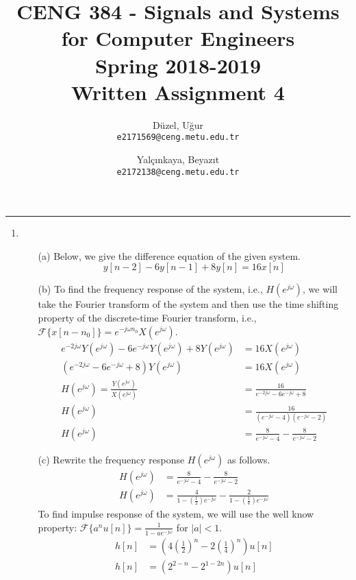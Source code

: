 \documentclass[10pt,a4paper, margin=1in]{article}
\author{
  Düzel, Uğur\\
  \texttt{e2171569@ceng.metu.edu.tr}
  \and
  Yalçınkaya, Beyazıt\\
  \texttt{e2172138@ceng.metu.edu.tr}
}
\title{CENG 384 - Signals and Systems for Computer Engineers \\
Spring 2018-2019 \\
Written Assignment 4}
\begin{document}
\maketitle



\noindent\rule{19cm}{1.2pt}

\begin{enumerate}

\item 
	\begin{itemize}
		\item[(a)]
			Below, we give the difference equation of the given system.
			\begin{equation}
				y[n - 2] - 6y[n - 1] + 8y[n] = 16x[n]
			\end{equation}
		
		\item[(b)]
			To find the frequency response of the system, i.e., $H(e^{j\omega})$, we will take the Fourier transform of the system and then use the time shifting property of the discrete-time Fourier transform, i.e., $\mathcal{F}\{x[n - n_0]\} = e^{-j\omega n_0} X(e^{j\omega})$.
			\begin{equation}
			\begin{split}
				e^{-2j\omega } Y(e^{j\omega}) - 6e^{-j\omega } Y(e^{j\omega}) + 8Y(e^{j\omega}) & = 16X(e^{j\omega})\\
				(e^{-2j\omega } - 6e^{-j\omega } + 8)Y(e^{j\omega}) & = 16X(e^{j\omega})\\
				H(e^{j\omega}) = \frac{Y(e^{j\omega})}{X(e^{j\omega})} & = \frac{16}{e^{-2j\omega } - 6e^{-j\omega } + 8}\\
				H(e^{j\omega}) & = \frac{16}{(e^{-j\omega} - 4)(e^{-j\omega} - 2)}\\
				H(e^{j\omega}) & = \frac{8}{e^{-j\omega} - 4} - \frac{8}{e^{-j\omega} - 2}
			\end{split}
			\end{equation}
			
		\item[(c)]
			Rewrite the frequency response $H(e^{j\omega})$ as follows.
			\begin{equation}
			\begin{split}
				H(e^{j\omega}) & = \frac{8}{e^{-j\omega} - 4} - \frac{8}{e^{-j\omega} - 2}\\
				H(e^{j\omega}) & = \frac{4}{1 - \left(\frac{1}{2}\right)e^{-j\omega}} - \frac{2}{1 - \left(\frac{1}{4}\right)e^{-j\omega}}
			\end{split}
			\end{equation}
			To find impulse response of the system, we will use the well know property: $\mathcal{F}\{a^nu[n]\} = \frac{1}{1-ae^{-j\omega}}$ for $|a| < 1$.
			\begin{equation}
			\begin{split}
				h[n] & = \left( 4\left( \frac{1}{2} \right)^n - 2\left( \frac{1}{4} \right)^n \right) u[n]\\
				h[n] & = \left( 2^{2 - n} - 2^{1-2n} \right) u[n]
			\end{split}
			\end{equation}
			

\end{itemize}
\end{enumerate}
\end{document}
